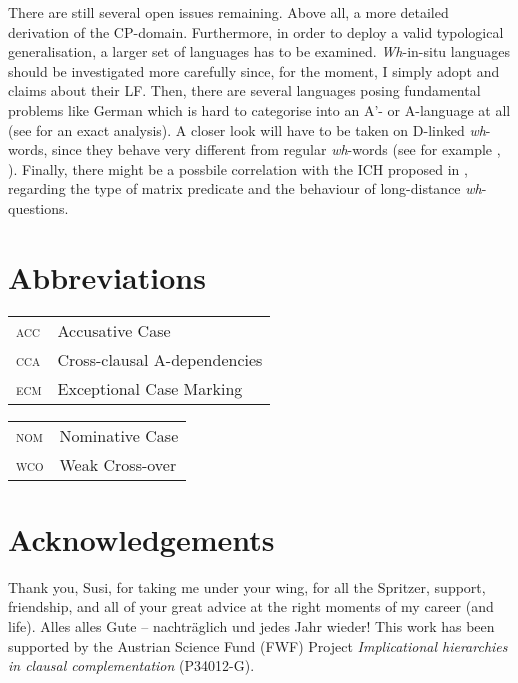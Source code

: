 \documentclass[output=paper,colorlinks,citecolor=brown]{langscibook}
\begin{document}
There are still several open issues remaining. Above all, a more detailed derivation of the CP-domain. Furthermore, in order to deploy a valid typological generalisation, a larger set of languages has to be examined. \textit{Wh}-in-situ languages should be investigated more carefully since, for the moment, I simply adopt  and  claims about their LF. Then, there are several languages posing fundamental problems like German which is hard to categorise into an A'- or A-language at all (see \citealp{wiltschko1997d} for an exact analysis). A closer look will have to be taken on D-linked \textit{wh}-words, since they behave very different from regular \textit{wh}-words (see for example \citealp{pesetsky1987wh}, \citealp{krapova1999subjunctive}). Finally, there might be a possbile correlation with the ICH proposed in \citet{WurmbrandLohningerToAppear}, regarding the type of matrix predicate and the behaviour of long-distance \textit{wh}-questions. 


\section*{Abbreviations}
\begin{tabularx}{.5\textwidth}[t]{@{}lQ}
\textsc{acc} & Accusative Case              \\
\textsc{cca} & Cross-clausal A-dependencies\\
\textsc{ecm} & Exceptional Case Marking   \\    
\end{tabularx}\begin{tabularx}{.5\textwidth}[t]{lQ@{}}
\textsc{nom} & Nominative Case \\
\textsc{wco} & Weak Cross-over \\
\end{tabularx}



\section*{Acknowledgements}
Thank you, Susi, for taking me under your wing, for all the Spritzer, support, friendship, and all of your great advice at the right moments of my career (and life). Alles alles Gute – nachträglich und jedes Jahr wieder! This work has been supported by the Austrian Science Fund (FWF) Project \textit{Implicational hierarchies in clausal complementation} (P34012-G).

\printbibliography[heading=subbibliography,notkeyword=this]
\end{document}
